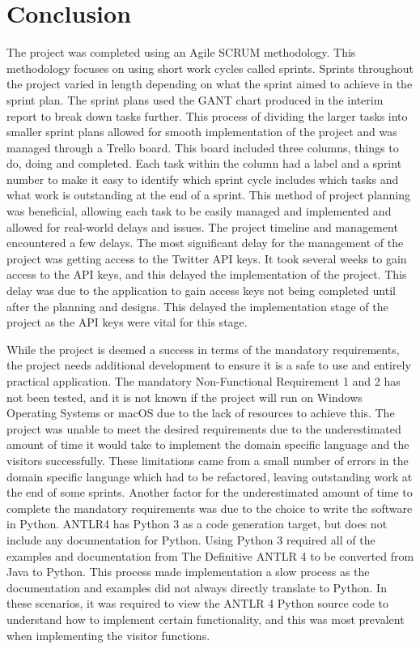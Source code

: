 \section{Conclusion}

The project was completed using an Agile SCRUM methodology. This methodology focuses on using short work cycles called sprints. Sprints throughout the project varied in length depending on what the sprint aimed to achieve in the sprint plan. The sprint plans used the GANT chart produced in the interim report to break down tasks further. This process of dividing the larger tasks into smaller sprint plans allowed for smooth implementation of the project and was managed through a Trello board. This board included three columns, things to do, doing and completed. Each task within the column had a label and a sprint number to make it easy to identify which sprint cycle includes which tasks and what work is outstanding at the end of a sprint. This method of project planning was beneficial, allowing each task to be easily managed and implemented and allowed for real-world delays and issues. The project timeline and management encountered a few delays. The most significant delay for the management of the project was getting access to the Twitter API keys. It took several weeks to gain access to the API keys, and this delayed the implementation of the project. This delay was due to the application to gain access keys not being completed until after the planning and designs. This delayed the implementation stage of the project as the API keys were vital for this stage. \newline \par

While the project is deemed a success in terms of the mandatory requirements, the project needs additional development to ensure it is a safe to use and entirely practical application. The mandatory Non-Functional Requirement 1 and 2 has not been tested, and it is not known if the project will run on Windows Operating Systems or macOS due to the lack of resources to achieve this. The project was unable to meet the desired requirements due to the underestimated amount of time it would take to implement the domain specific language and the visitors successfully. These limitations came from a small number of errors in the domain specific language which had to be refactored, leaving outstanding work at the end of some sprints. Another factor for the underestimated amount of time to complete the mandatory requirements was due to the choice to write the software in Python. ANTLR4 has Python 3 as a code generation target, but does not include any documentation for Python. Using Python 3 required all of the examples and documentation from The Definitive ANTLR 4 \cite{parr2013definitive} to be converted from Java to Python. This process made implementation a slow process as the documentation and examples did not always directly translate to Python. In these scenarios, it was required to view the ANTLR 4 Python source code to understand how to implement certain functionality, and this was most prevalent when implementing the visitor functions. \newline \par

